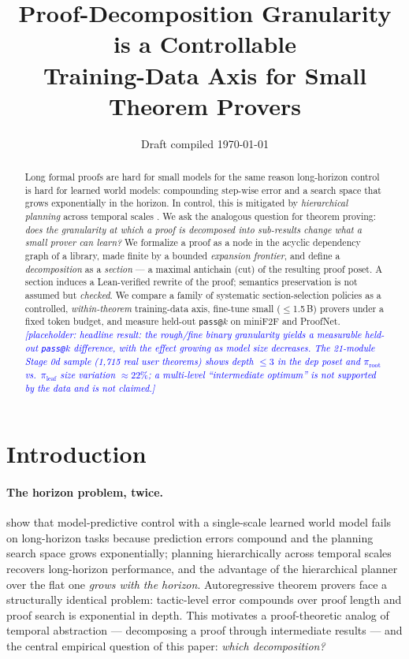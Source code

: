 \documentclass[11pt]{article}
\title{Proof-Decomposition Granularity is a Controllable\\
       Training-Data Axis for Small Theorem Provers}
\author{\TODO{authors} }
\date{Draft compiled \today}
\newcommand{\PLACEHOLDER}[1]{\textcolor{blue}{\emph{[placeholder: #1]}}}
\begin{document}
\maketitle

\begin{abstract}
Long formal proofs are hard for small models for the same reason long-horizon
control is hard for learned world models: compounding step-wise error and a
search space that grows exponentially in the horizon. In control, this is
mitigated by \emph{hierarchical planning} across temporal scales
\citep{zhang2026hierarchical}. We ask the analogous question for theorem
proving: \emph{does the granularity at which a proof is decomposed into
sub-results change what a small prover can learn?} We formalize a proof as a
node in the acyclic dependency graph of a library, made finite by a bounded
\emph{expansion frontier}, and define a \emph{decomposition} as a
\emph{section} --- a maximal antichain (cut) of the resulting proof poset. A
section induces a Lean-verified rewrite of the proof; semantics preservation is
not assumed but \emph{checked}. We compare a family of systematic
section-selection policies as a controlled, \emph{within-theorem}
training-data axis, fine-tune small ($\leq$1.5\,B) provers under a fixed token
budget, and measure held-out \texttt{pass@}$k$ on miniF2F and ProofNet.
\PLACEHOLDER{headline result: the rough/fine binary granularity yields a
measurable held-out \texttt{pass@}$k$ difference, with the effect growing as
model size decreases. The 21-module Stage 0d sample (1{,}715 real user
theorems) shows depth $\leq 3$ in the dep poset and $\pi_{\mathrm{root}}$
vs.~$\pi_{\mathrm{leaf}}$ size variation ${\approx}22\%$; a multi-level
``intermediate optimum'' is not supported by the data and is not claimed.}
\end{abstract}

\section{Introduction}
\label{sec:intro}

\paragraph{The horizon problem, twice.} \citet{zhang2026hierarchical} show that
model-predictive control with a single-scale learned world model fails on
long-horizon tasks because prediction errors compound and the planning search
space grows exponentially; planning hierarchically across temporal scales
recovers long-horizon performance, and the advantage of the hierarchical
planner over the flat one \emph{grows with the horizon}. Autoregressive
theorem provers face a structurally identical problem: tactic-level error
compounds over proof length and proof search is exponential in depth. This
motivates a proof-theoretic analog of temporal abstraction --- decomposing a
proof through intermediate results --- and the central empirical question of
this paper: \emph{which decomposition?}
\end{document}
